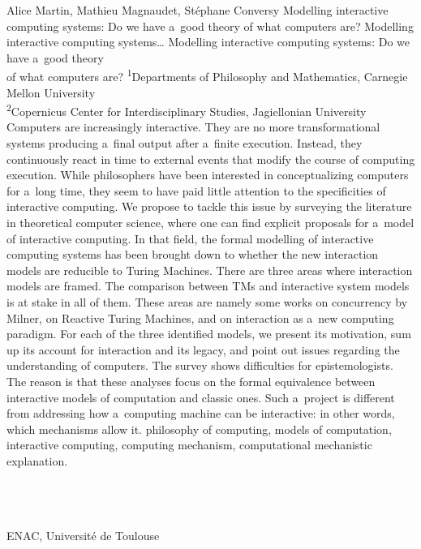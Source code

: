 \begin{artengenv2auth}{Alice Martin, Mathieu Magnaudet, Stéphane Conversy}
	{Modelling interactive computing systems: Do we have a~good theory of what computers are?}
	{Modelling interactive computing systems\ldots}
	{Modelling interactive computing systems: Do we have a~good theory\\of what computers are?}
	{\textsuperscript{1}Departments of Philosophy and Mathematics, Carnegie Mellon University\\
		\textsuperscript{2}Copernicus Center for Interdisciplinary Studies, Jagiellonian University}
	{Computers are increasingly interactive. They are no more transformational systems producing a~final output after a~finite execution. Instead, they continuously react in time to external events that modify the course of computing execution. While philosophers have been interested in conceptualizing computers for a~long time, they seem to have paid little attention to the specificities of interactive computing. We propose to tackle this issue by surveying the literature in theoretical computer science, where one can find explicit proposals for a~model of interactive computing. 
	In that field, the formal modelling of interactive computing systems has been brought down to whether the new interaction models are reducible to Turing Machines. There are three areas where interaction models are framed. The comparison between TMs and interactive system models is at stake in all of them. These areas are namely some works on concurrency by Milner, on Reactive Turing Machines, and on interaction as a~new computing paradigm. For each of the three identified models, we present its motivation, sum up its account for interaction and its legacy, and point out issues regarding the understanding of computers. The survey shows difficulties for epistemologists. The reason is that these analyses focus on the formal equivalence between interactive models of computation and classic ones. Such a~project is different from addressing how a~computing machine can be interactive: in other words, which mechanisms allow it.}
	{philosophy of computing, models of computation, interactive computing, computing mechanism, computational mechanistic explanation.}
	{%
				{\flushright{}\\\\\\
				\subsubsectit\small{ENAC, Université de Toulouse}\par}%
	}


\end{artengenv2auth}
